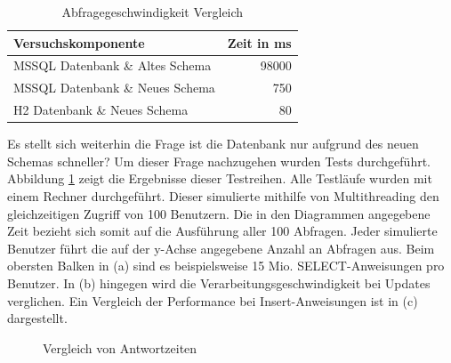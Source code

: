 \begin{table}[htbp]
\centering
\begin{tabular} {l | r}
Versuchskomponente & Zeit in ms  \\ \hline
MSSQL Datenbank \& Altes Schema & 98000 \\
MSSQL Datenbank \& Neues Schema & 750 \\
H2 Datenbank \& Neues Schema & 80 \\
\end{tabular}
\caption{Abfragegeschwindigkeit Vergleich}
\label{tb:vergleichAbfragegeschwindigkeit}
\end{table}

Es stellt sich weiterhin die Frage ist die Datenbank nur aufgrund des neuen Schemas schneller? Um dieser Frage nachzugehen wurden Tests durchgeführt. Abbildung \ref{ergebniss_vergleich} zeigt die Ergebnisse dieser Testreihen. Alle Testläufe wurden mit einem Rechner durchgeführt. Dieser simulierte mithilfe von Multithreading den gleichzeitigen Zugriff von 100 Benutzern. Die in den Diagrammen angegebene Zeit bezieht sich somit auf die Ausführung aller 100 Abfragen. Jeder simulierte Benutzer führt die auf der y-Achse angegebene Anzahl an Abfragen aus. Beim obersten Balken in (a) sind es beispielsweise 15 Mio. SELECT-Anweisungen pro Benutzer. In (b) hingegen wird die Verarbeitungsgeschwindigkeit bei Updates verglichen. Ein Vergleich der Performance bei Insert-Anweisungen ist in (c) dargestellt.    

\begin{figure}[htbp]
\centering
{}\hfill
{}\hfill
{}
\caption{Vergleich von Antwortzeiten}
\label{ergebniss_vergleich}
\end{figure}

